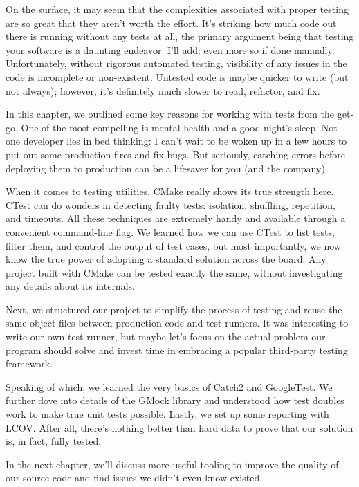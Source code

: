 On the surface, it may seem that the complexities associated with proper testing are so great that they aren’t worth the effort. It’s striking how much code out there is running without any tests at all, the primary argument being that testing your software is a daunting endeavor. I’ll add: even more so if done manually. Unfortunately, without rigorous automated testing, visibility of any issues in the code is incomplete or non-existent. Untested code is maybe quicker to write (but not always); however, it’s definitely much slower to read, refactor, and fix.

In this chapter, we outlined some key reasons for working with tests from the get-go. One of the most compelling is mental health and a good night’s sleep. Not one developer lies in bed thinking: I can’t wait to be woken up in a few hours to put out some production fires and fix bugs. But seriously, catching errors before deploying them to production can be a lifesaver for you (and the company).

When it comes to testing utilities, CMake really shows its true strength here. CTest can do wonders in detecting faulty tests: isolation, shuffling, repetition, and timeouts. All these techniques are extremely handy and available through a convenient command-line flag. We learned how we can use CTest to list tests, filter them, and control the output of test cases, but most importantly, we now know the true power of adopting a standard solution across the board. Any project built with CMake can be tested exactly the same, without investigating any details about its internals.

Next, we structured our project to simplify the process of testing and reuse the same object files between production code and test runners. It was interesting to write our own test runner, but maybe let’s focus on the actual problem our program should solve and invest time in embracing a popular third-party testing framework.

Speaking of which, we learned the very basics of Catch2 and GoogleTest. We further dove into details of the GMock library and understood how test doubles work to make true unit tests possible. Lastly, we set up some reporting with LCOV. After all, there’s nothing better than hard data to prove that our solution is, in fact, fully tested.

In the next chapter, we’ll discuss more useful tooling to improve the quality of our source code and find issues we didn’t even know existed.